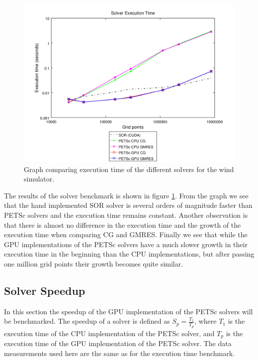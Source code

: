 \begin{figure}[ht]
	\center
	\includegraphics[width=1.0\textwidth]{results/data/sb/exec_time_all}
	\caption{Graph comparing execution time of the different solvers for the
		wind simulator.}
	\label{fig:sb_exec_time_all}
\end{figure}

The results of the solver benchmark is shown in figure \ref{fig:sb_exec_time_all}.
From the graph we see that the hand implemented SOR solver is several orders of
magnitude faster than PETSc solvers and the execution time remains constant.
Another observation is that there is almost no difference in the execution time
and the growth of the execution time when comparing CG and GMRES. Finally we see
that while the GPU implementations of the PETSc solvers have a much slower growth
in their execution time in the beginning than the CPU implementations, but after
passing one million grid points their growth becomes quite similar.

\subsection{Solver Speedup}

In this section the speedup of the GPU implementation of the PETSc solvers will
be benchmarked. The speedup of a solver is defined as $S_p = \frac{T_1}{T_p}$,
where $T_1$ is the execution time of the CPU implementation of the PETSc solver,
and $T_p$ is the execution time of the GPU implementation of the PETSc solver.
The data measurements used here are the same as for the execution time benchmark.

